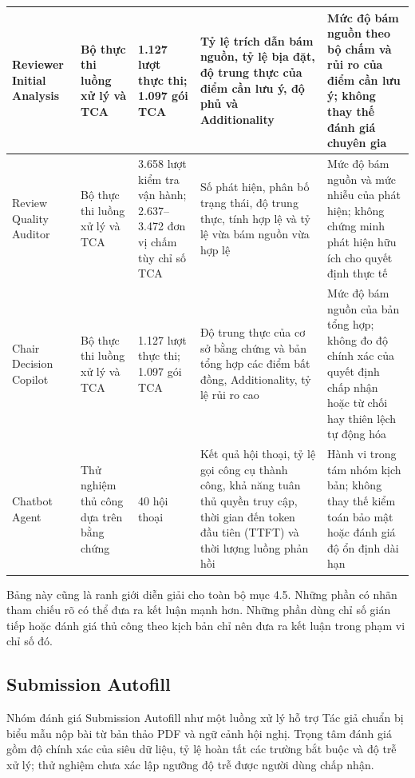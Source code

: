 \begin{PrismLongTable}
\begin{longtable}{|P{0.188\textwidth}|P{0.188\textwidth}|P{0.188\textwidth}|P{0.188\textwidth}|P{0.188\textwidth}|}
  Reviewer Initial Analysis      &      Bộ thực thi luồng xử lý và TCA      &      1.127 lượt thực thi; 1.097 gói TCA      &      Tỷ lệ trích dẫn bám nguồn, tỷ lệ bịa đặt, độ trung thực của điểm cần lưu ý, độ phủ và Additionality      &      Mức độ bám nguồn theo bộ chấm và rủi ro của điểm cần lưu ý; không thay thế đánh giá chuyên gia \\ \hline
  Review Quality Auditor     &     Bộ thực thi luồng xử lý và TCA     &     3.658 lượt kiểm tra vận hành; 2.637--3.472 đơn vị chấm tùy chỉ số TCA     &     Số phát hiện, phân bố trạng thái, độ trung thực, tính hợp lệ và tỷ lệ vừa bám nguồn vừa hợp lệ     &     Mức độ bám nguồn và mức nhiễu của phát hiện; không chứng minh phát hiện hữu ích cho quyết định thực tế \\ \hline
  Chair Decision Copilot      &      Bộ thực thi luồng xử lý và TCA      &      1.127 lượt thực thi; 1.097 gói TCA      &      Độ trung thực của cơ sở bằng chứng và bản tổng hợp các điểm bất đồng, Additionality, tỷ lệ rủi ro cao      &      Mức độ bám nguồn của bản tổng hợp; không đo độ chính xác của quyết định chấp nhận hoặc từ chối hay thiên lệch tự động hóa \\ \hline
  Chatbot Agent     &     Thử nghiệm thủ công dựa trên bằng chứng     &     40 hội thoại     &     Kết quả hội thoại, tỷ lệ gọi công cụ thành công, khả năng tuân thủ quyền truy cập, thời gian đến token đầu tiên (TTFT) và thời lượng luồng phản hồi     &     Hành vi trong tám nhóm kịch bản; không thay thế kiểm toán bảo mật hoặc đánh giá độ ổn định dài hạn \\ \hline
\end{longtable}
\end{PrismLongTable}

Bảng này cũng là ranh giới diễn giải cho toàn bộ mục 4.5. Những phần có nhãn tham chiếu rõ có thể đưa ra kết luận mạnh hơn. Những phần dùng chỉ số gián tiếp hoặc đánh giá thủ công theo kịch bản chỉ nên đưa ra kết luận trong phạm vi chỉ số đó.

\subsection{Submission Autofill}

Nhóm đánh giá Submission Autofill như một luồng xử lý hỗ trợ Tác giả chuẩn bị biểu mẫu nộp bài từ bản thảo PDF và ngữ cảnh hội nghị. Trọng tâm đánh giá gồm độ chính xác của siêu dữ liệu, tỷ lệ hoàn tất các trường bắt buộc và độ trễ xử lý; thử nghiệm chưa xác lập ngưỡng độ trễ được người dùng chấp nhận.

